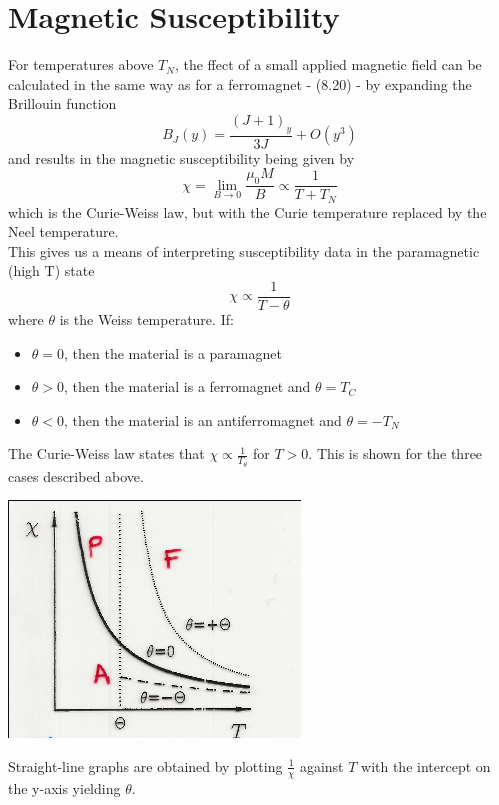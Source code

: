 \documentclass[a4paper, 11pt, normalem]{report}
\begin{document}
\section{Magnetic Susceptibility}
For temperatures above $T_N$, the ffect of a small applied magnetic field can be calculated in the same way as for a ferromagnet - (8.20) - by expanding the Brillouin function
\begin{equation}
    B_J(y) = \frac{(J+1)_y}{3J} + O(y^3)
\end{equation}
and results in the magnetic susceptibility being given by 
\begin{equation}
    \chi = \lim_{B\to0} \frac{\mu_0M}{B} \propto \frac{1}{T+T_N}
\end{equation}
which is the Curie-Weiss law, but with the Curie temperature replaced by the Neel temperature. \\
This gives us a means of interpreting susceptibility data in the paramagnetic (high T) state
\begin{equation}
    \chi \propto \frac{1}{T-\theta}
\end{equation}
where $\theta$ is the Weiss temperature. 
If:
\begin{itemize}
    \item $\theta = 0$, then the material is a paramagnet
    \item $\theta > 0$, then the material is a ferromagnet and $\theta = T_C$
    \item $\theta < 0$, then the material is an antiferromagnet and $\theta = -T_N$
\end{itemize}
The Curie-Weiss law states that $\chi \propto \frac{1}{T_\theta}$ for $T>0$.
This is shown for the three cases described above. 
\begin{center}
    \includegraphics[scale=0.5]{curweiss.png}
\end{center}
Straight-line graphs are obtained by plotting $\frac{1}{\chi}$ against $T$ with the intercept on the y-axis yielding $\theta$.
\end{document}

